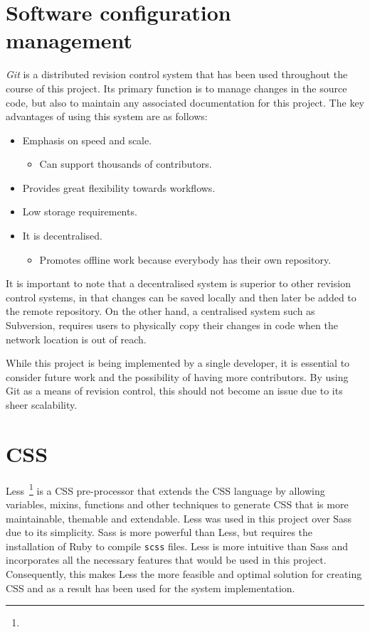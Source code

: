 \section{Software configuration management} {
\label{sec:software_configuration_management}

	\emph{Git} is a distributed revision control system that has been used throughout the course of this project. Its primary function is to manage changes in the source code, but also to maintain any associated documentation for this project. The key advantages of using this system are as follows:

	\begin{itemize}
		\item Emphasis on speed and scale.
			\begin{itemize}
				\item Can support thousands of contributors.
			\end{itemize}
		\item Provides great flexibility towards workflows.
		\item Low storage requirements.
		\item It is decentralised.
			\begin{itemize}
				\item Promotes offline work because everybody has their own repository.
			\end{itemize}
	\end{itemize}

	It is important to note that a decentralised system is superior to other revision control systems, in that changes can be saved locally and then later be added to the remote repository. On the other hand, a centralised system such as Subversion, requires users to physically copy their changes in code when the network location is out of reach.

	While this project is being implemented by a single developer, it is essential to consider future work and the possibility of having more contributors. By using Git as a means of revision control, this should not become an issue due to its sheer scalability.

}

\section{CSS} {
\label{sec:css}

	Less~\footnote{} is a CSS pre-processor that extends the CSS language by allowing variables, mixins, functions and other techniques to generate CSS that is more maintainable, themable and extendable. Less was used in this project over Sass due to its simplicity. Sass is more powerful than Less, but requires the installation of Ruby to compile \texttt{scss} files. Less is more intuitive than Sass and incorporates all the necessary features that would be used in this project. Consequently, this makes Less the more feasible and optimal solution for creating CSS and as a result has been used for the system implementation.

}

